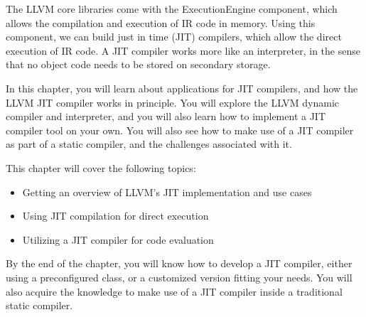 The LLVM core libraries come with the ExecutionEngine component, which allows the compilation and execution of IR code in memory. Using this component, we can build just in time (JIT) compilers, which allow the direct execution of IR code. A JIT compiler works more like an interpreter, in the sense that no object code needs to be stored on secondary storage.\par

In this chapter, you will learn about applications for JIT compilers, and how the LLVM JIT compiler works in principle. You will explore the LLVM dynamic compiler and interpreter, and you will also learn how to implement a JIT compiler tool on your own. You will also see how to make use of a JIT compiler as part of a static compiler, and the challenges associated with it.\par

This chapter will cover the following topics:\par

\begin{itemize}
\item Getting an overview of LLVM's JIT implementation and use cases
\item Using JIT compilation for direct execution
\item Utilizing a JIT compiler for code evaluation
\end{itemize}

By the end of the chapter, you will know how to develop a JIT compiler, either using a preconfigured class, or a customized version fitting your needs. You will also acquire the knowledge to make use of a JIT compiler inside a traditional static compiler.\par










